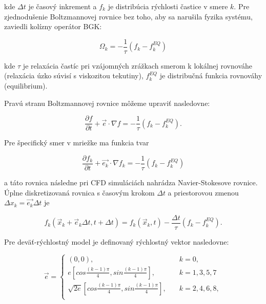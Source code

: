 \documentclass[]{tukediphc}
\begin{document}
kde $\Delta t$ je časový inkrement a $f_k$ je distribúcia rýchlosti častice v smere $k$. Pre zjednodušenie Boltzmannovej rovnice bez toho, aby sa narušila fyzika systému, zaviedli \cite{bhatnagar1954} kolízny operátor BGK:

\begin{equation}
\Omega_k = - \frac{1}{\tau}(f_k-f_k^{EQ})
\end{equation}

kde $\tau$ je relaxácia častíc pri vzájomných zrážkach smerom k lokálnej rovnováhe (relaxácia úzko súvisí s viskozitou tekutiny), $f_k^{EQ}$ je distribučná funkcia rovnováhy (equilibrium).

Pravú stranu Boltzmannovej rovnice môžeme upraviť nasledovne:

\begin{equation}
\frac{\partial f}{\partial t} + \vec{e} \cdot \nabla f = - \frac{1}{\tau}\left(f_k-f_k^{EQ}\right).
\end{equation}

Pre špecifický smer v mriežke ma funkcia tvar

\begin{equation}
\frac{\partial f_k}{\partial t} + \vec{e_k} \cdot \nabla f_k = - \frac{1}{\tau} \left(f_k-f_k^{EQ} \right)
\end{equation}

a táto rovnica následne pri CFD simuláciách nahrádza Navier-Stokesove rovnice. Úplne diskretizovaná rovnica s časovým krokom $\Delta t$ a priestorovou zmenou \\ $\Delta x_k=\vec{e_k}\Delta t$ je

\begin{equation}
f_k(\vec{x}_k + \vec{e}_k \Delta t,  t + \Delta t) = f_k(\vec{x}_k,t) - \frac{\Delta t}{\tau} \left(f_k-f_k^{EQ} \right).
\end{equation}

Pre deväť-rýchlostný model je definovaný rýchlostný vektor nasledovne:

\begin{equation}
\vec{e} = \left\{
\begin{array}{ll}
(0,0), & \quad k = 0, \\
e\left[cos \frac{(k-1)\pi}{4}, sin \frac{(k-1)\pi}{4}\right], & \quad k = 1,3,5,7 \\
\sqrt{2e}\left[cos \frac{(k-1)\pi}{4}, sin \frac{(k-1)\pi}{4}\right], & \quad k = 2,4,6,8, \\
\end{array}
\right.
\end{equation}
\end{document}
